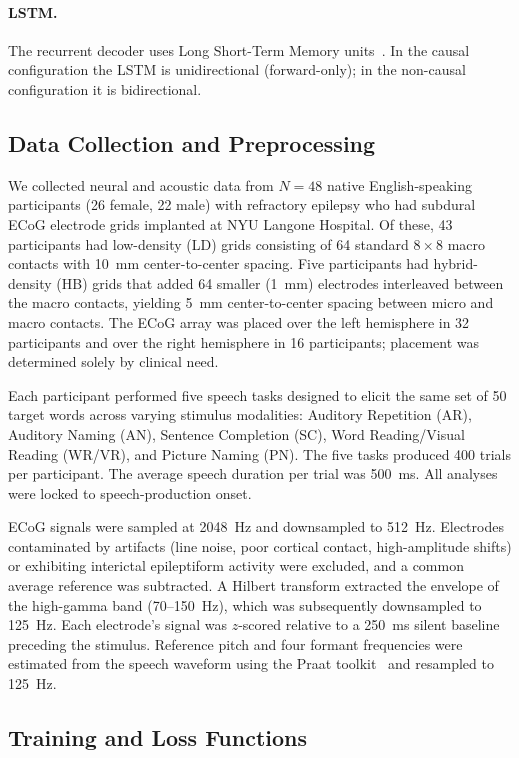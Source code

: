 \documentclass[10pt]{article}
\begin{document}
\paragraph{LSTM.}
The recurrent decoder uses Long Short-Term Memory units~\cite{hochreiter1997lstm}. In the causal configuration the LSTM is unidirectional (forward-only); in the non-causal configuration it is bidirectional.

\subsection{Data Collection and Preprocessing}

We collected neural and acoustic data from $N=48$ native English-speaking participants (26 female, 22 male) with refractory epilepsy who had subdural ECoG electrode grids implanted at NYU Langone Hospital. Of these, 43 participants had low-density (LD) grids consisting of 64 standard $8\times8$ macro contacts with 10~mm center-to-center spacing. Five participants had hybrid-density (HB) grids that added 64 smaller (1~mm) electrodes interleaved between the macro contacts, yielding 5~mm center-to-center spacing between micro and macro contacts. The ECoG array was placed over the left hemisphere in 32 participants and over the right hemisphere in 16 participants; placement was determined solely by clinical need.

Each participant performed five speech tasks designed to elicit the same set of 50 target words across varying stimulus modalities: Auditory Repetition (AR), Auditory Naming (AN), Sentence Completion (SC), Word Reading/Visual Reading (WR/VR), and Picture Naming (PN). The five tasks produced 400 trials per participant. The average speech duration per trial was 500~ms. All analyses were locked to speech-production onset.

ECoG signals were sampled at 2048~Hz and downsampled to 512~Hz. Electrodes contaminated by artifacts (line noise, poor cortical contact, high-amplitude shifts) or exhibiting interictal epileptiform activity were excluded, and a common average reference was subtracted. A Hilbert transform extracted the envelope of the high-gamma band (70--150~Hz), which was subsequently downsampled to 125~Hz. Each electrode's signal was $z$-scored relative to a 250~ms silent baseline preceding the stimulus. Reference pitch and four formant frequencies were estimated from the speech waveform using the Praat toolkit~\cite{boersma2001praat} and resampled to 125~Hz.

\subsection{Training and Loss Functions}
\end{document}
